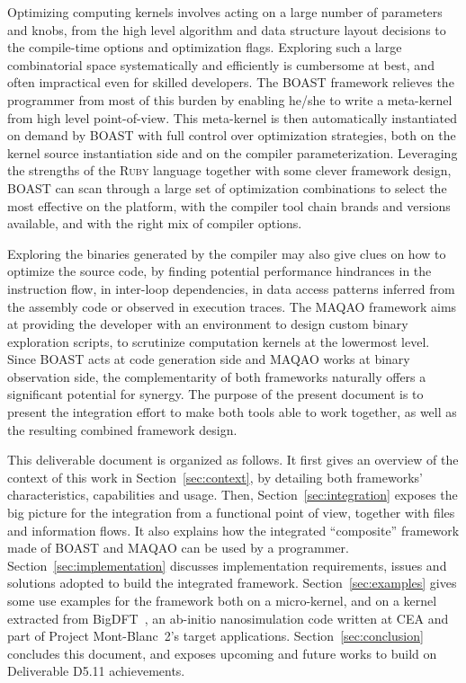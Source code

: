 \documentclass[11pt, a4paper, twoside]{montblanc2}
\def\ruby{\textsc{Ruby}\xspace}
\begin{document}
Optimizing computing kernels involves acting on a large number of parameters and 
knobs, from the high level algorithm and data structure layout decisions to the 
compile-time options and optimization flags. Exploring such a large 
combinatorial space systematically and efficiently is cumbersome at best, and 
often impractical even for skilled developers. The BOAST framework relieves the 
programmer from most of this burden by enabling he/she to write a meta-kernel 
from high level point-of-view. This meta-kernel is then automatically 
instantiated on demand by BOAST with full control over optimization strategies, 
both on the kernel source instantiation side and on the compiler 
parameterization. Leveraging the strengths of the \ruby language together with 
some clever framework design, BOAST can scan through a large set of optimization 
combinations to select the most effective on the platform, with the compiler 
tool chain brands and versions available, and with the right mix of compiler 
options.

Exploring the binaries generated by the compiler may also give clues on how to 
optimize the source code, by finding potential performance hindrances in the 
instruction flow, in inter-loop dependencies, in data access patterns inferred 
from the assembly code or observed in execution traces. The MAQAO framework aims 
at providing the developer with an environment to design custom binary 
exploration scripts, to scrutinize computation kernels at the lowermost level. 
Since BOAST acts at code generation side and MAQAO works at binary observation 
side, the complementarity of both frameworks naturally offers a significant 
potential for synergy. The purpose of the present document is to present the 
integration effort to make both tools able to work together, as well as the 
resulting combined framework design.

This deliverable document is organized as follows. It first gives an overview of 
the context of this work in Section~\ref{sec:context}, by detailing both 
frameworks' characteristics, capabilities and usage. Then, 
Section~\ref{sec:integration} exposes the big picture for the integration from a 
functional point of view, together with files and information flows. It also 
explains how the integrated ``composite'' framework made of BOAST and MAQAO can 
be used by a programmer. Section~\ref{sec:implementation} discusses 
implementation requirements, issues and solutions adopted to build the 
integrated framework. Section~\ref{sec:examples} gives some use examples for the 
framework both on a micro-kernel, and on a kernel extracted from
BigDFT~\cite{genovese:bigdft:jcp:2008}, an ab-initio nanosimulation code
written at CEA and part of Project Mont-Blanc~2's target applications.
Section~\ref{sec:conclusion} concludes this document, and exposes upcoming and
future works to build on Deliverable D5.11 achievements.
\end{document}
